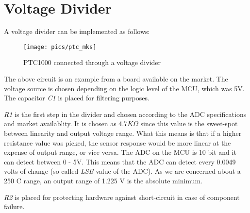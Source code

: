 \section*{Voltage Divider}

A voltage divider can be implemented as follows:
\begin{figure}[H]
    \centering
    \texttt{[image: pics/ptc\_mks]}
    \caption{PTC1000 connected through a voltage divider\cite{mksboard}}
\end{figure}
The above circuit is an example from a board available on the market. \cite{mksboard} The voltage source is chosen depending on the logic level of the MCU, which was 5V. The capacitor \textit{C1} is placed for filtering purposes.

\textit{R1} is the first step in the divider and chosen according to the ADC specifications and market availablity. It is chosen as 4.7$K\Omega$ since this value is the sweet-spot between linearity and output voltage range. What this means is that if a higher resistance value was picked, the sensor response would be more linear at the expense of output range, or vice versa. The ADC on the MCU is 10 bit and it can detect between 0 - 5V. This means that the ADC can detect every 0.0049 volts of change (so-called \textit{LSB} value of the ADC). As we are concerned about a 250 \degree C range, an output range of 1.225 V is the absolute minimum.

\textit{R2} is placed for protecting hardware against short-circuit in case of component failure.
